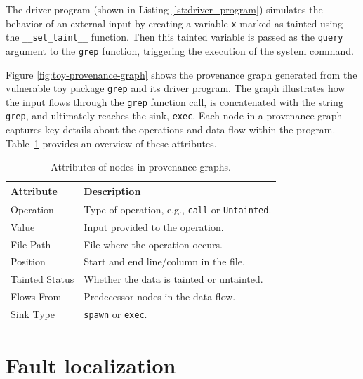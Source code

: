 \documentclass[12pt,openany,oneside,table]{cmuthesis}
\begin{document}
The driver program (shown in Listing \ref{lst:driver_program}) simulates the behavior of an external input by creating a variable \texttt{x} marked as tainted using the \texttt{\_\_set\_taint\_\_} function. Then this tainted variable is passed as the \texttt{query} argument to the \texttt{grep} function, triggering the execution of the system command.


Figure \ref{fig:toy-provenance-graph} shows the provenance graph generated from the vulnerable toy package \texttt{grep} and its driver program. The graph illustrates how the input flows through the \texttt{grep} function call, is concatenated with the string \texttt{grep}, and ultimately reaches the sink, \texttt{exec}.
Each node in a provenance graph captures key details about the operations and data flow within the program. Table~\ref{tab:node_attributes} provides an overview of these attributes.

\begin{table}[h]
\centering
\caption{Attributes of nodes in provenance graphs.\label{tab:node_attributes}}
\begin{tabular}{@{}ll@{}}
\toprule
\textbf{Attribute}          & \textbf{Description}                       \\ \midrule
Operation         & Type of operation, e.g., \texttt{call} or \texttt{Untainted}. \\ \midrule
Value             & Input provided to the operation.           \\ \midrule
File Path         & File where the operation occurs.           \\ \midrule
Position          & Start and end line/column in the file.     \\ \midrule
Tainted Status    & Whether the data is tainted or untainted.  \\ \midrule
Flows From        & Predecessor nodes in the data flow.        \\ \midrule
Sink Type         & \texttt{spawn} or \texttt{exec}. \\ \bottomrule
\end{tabular}
\end{table}



\chapter{Fault localization}
\label{ch:llmao}

\end{document}
